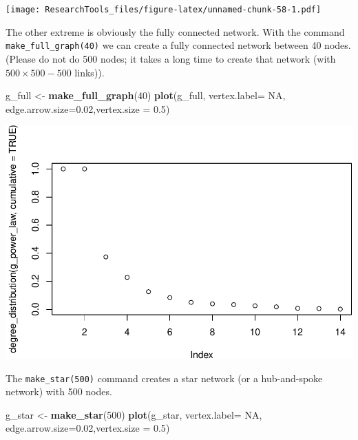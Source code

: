 \documentclass[]{article}
\newenvironment{Shaded}{\begin{snugshade}}{\end{snugshade}}
\newcommand{\KeywordTok}[1]{\textcolor[rgb]{0.13,0.29,0.53}{\textbf{#1}}}
\newcommand{\DataTypeTok}[1]{\textcolor[rgb]{0.13,0.29,0.53}{#1}}
\newcommand{\DecValTok}[1]{\textcolor[rgb]{0.00,0.00,0.81}{#1}}
\newcommand{\FloatTok}[1]{\textcolor[rgb]{0.00,0.00,0.81}{#1}}
\newcommand{\StringTok}[1]{\textcolor[rgb]{0.31,0.60,0.02}{#1}}
\newcommand{\OtherTok}[1]{\textcolor[rgb]{0.56,0.35,0.01}{#1}}
\newcommand{\NormalTok}[1]{#1}
\theoremstyle{definition}
\theoremstyle{definition}
\theoremstyle{definition}
\theoremstyle{remark}
\begin{document}
\texttt{[image: ResearchTools\_files/figure-latex/unnamed-chunk-58-1.pdf]}

The other extreme is obviously the fully connected network. With the
command \texttt{make\_full\_graph(40)} we can create a fully connected
network between 40 nodes. (Please do not do 500 nodes; it takes a long
time to create that network (with \(500 \times 500 - 500\) links)).

\begin{Shaded}
\begin{Highlighting}[]
\NormalTok{g_full <-}\StringTok{ }\KeywordTok{make_full_graph}\NormalTok{(}\DecValTok{40}\NormalTok{)}
\KeywordTok{plot}\NormalTok{(g_full, }\DataTypeTok{vertex.label=} \OtherTok{NA}\NormalTok{, }\DataTypeTok{edge.arrow.size=}\FloatTok{0.02}\NormalTok{,}\DataTypeTok{vertex.size =} \FloatTok{0.5}\NormalTok{)}
\end{Highlighting}
\end{Shaded}

\includegraphics{ResearchTools_files/figure-latex/unnamed-chunk-59-1.pdf}

The \texttt{make\_star(500)} command creates a star network (or a
hub-and-spoke network) with 500 nodes.

\begin{Shaded}
\begin{Highlighting}[]
\NormalTok{g_star <-}\StringTok{ }\KeywordTok{make_star}\NormalTok{(}\DecValTok{500}\NormalTok{)}
\KeywordTok{plot}\NormalTok{(g_star, }\DataTypeTok{vertex.label=} \OtherTok{NA}\NormalTok{, }\DataTypeTok{edge.arrow.size=}\FloatTok{0.02}\NormalTok{,}\DataTypeTok{vertex.size =} \FloatTok{0.5}\NormalTok{)}
\end{Highlighting}
\end{Shaded}
\end{document}
